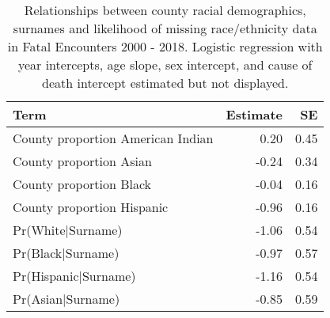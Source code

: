 \begin{table}[ht]
\centering
\begin{tabular}{lrr}
  \hline
Term & Estimate & SE \\ 
  \hline
County proportion American Indian & 0.20 & 0.45 \\ 
  County proportion Asian & -0.24 & 0.34 \\ 
  County proportion Black & -0.04 & 0.16 \\ 
  County proportion Hispanic & -0.96 & 0.16 \\ 
  Pr(White$|$Surname) & -1.06 & 0.54 \\ 
  Pr(Black$|$Surname) & -0.97 & 0.57 \\ 
  Pr(Hispanic$|$Surname) & -1.16 & 0.54 \\ 
  Pr(Asian$|$Surname) & -0.85 & 0.59 \\ 
   \hline
\end{tabular}
\caption{Relationships between county racial demographics,
         surnames and likelihood of missing race/ethnicity data in Fatal Encounters 2000 - 2018.
         Logistic regression with year intercepts, age slope, sex intercept, and
         cause of death intercept estimated but not displayed.} 
\label{tab:missing_reg}
\end{table}

